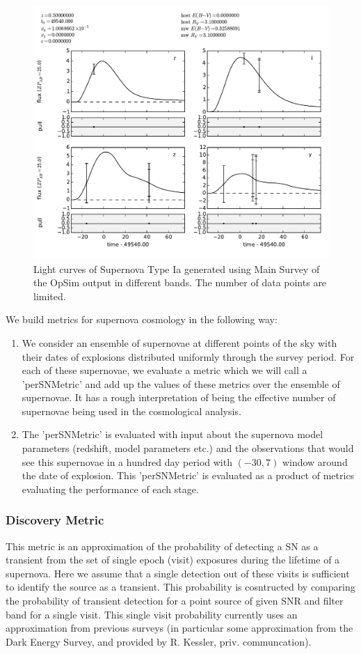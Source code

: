 \begin{figure}[tbh!]
\includegraphics[angle=0,width=0.99\hsize:,clip]{figs/SN_309_lc.pdf}
\caption{Light curves of Supernova Type Ia generated using Main Survey of the OpSim output in different bands. The number of data points are limited. 
}
\label{fig:SNIaLCopsimmain}
\end{figure}
We build metrics for supernova cosmology in the following way:
\begin{enumerate}
\item We consider an ensemble of supernovae at different points of the sky with  their dates of explosions distributed uniformly through the survey period. For each of these supernovae, we evaluate a metric which we will call a 'perSNMetric' and add up the values of these metrics over the ensemble of supernovae. It has a rough interpretation of being the effective number of supernovae being used in the cosmological analysis.
\item The 'perSNMetric' is evaluated with input about the supernova model parameters (redshift, model parameters etc.) and the observations that would see this supernovae in a hundred day period with $(-30, 7)$ window around the date of
explosion. This 'perSNMetric' is evaluated as a product of metrics evaluating
the performance of each stage. 
\end{enumerate}

\subsubsection{Discovery Metric}
This metric is an approximation of the probability of detecting a SN as a transient from the set of single epoch (visit) exposures during the lifetime of a
supernova. Here we assume that a single detection out of these visits is sufficient to identify the source as a transient. This probability is cosntructed
by comparing the probability of transient detection for a point source of
given SNR and filter band for a single visit. This single visit probability 
currently uses an approximation from previous surveys (in particular some approximation from the Dark Energy Survey, and provided by R. Kessler, priv. communcation).


